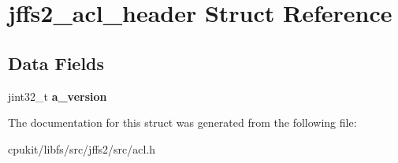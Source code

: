 \hypertarget{structjffs2__acl__header}{}\section{jffs2\+\_\+acl\+\_\+header Struct Reference}
\label{structjffs2__acl__header}
\subsection*{Data Fields}
\begin{DoxyCompactItemize}
\item 
\mbox{\label{structjffs2__acl__header_a8df1a8234b05baa2acf523465b60f97e}} 
jint32\+\_\+t {\bfseries a\+\_\+version}
\end{DoxyCompactItemize}


The documentation for this struct was generated from the following file\+:\begin{DoxyCompactItemize}
\item 
cpukit/libfs/src/jffs2/src/acl.\+h\end{DoxyCompactItemize}
